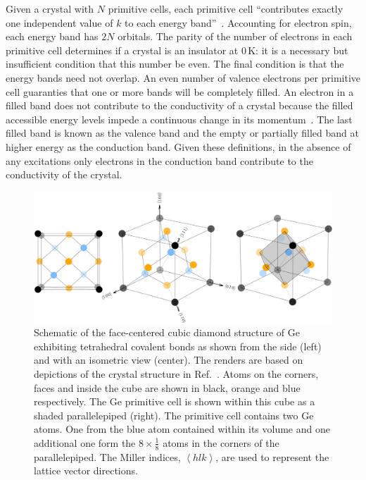 Given a crystal with $N$ primitive cells, each primitive cell ``contributes exactly one independent value of $k$ to each energy band''~\cite{kittel}. Accounting for electron spin, each energy band has $2N$ orbitals. The parity of the number of electrons in each primitive cell determines if a crystal is an insulator at 0\,K: it is a necessary but insufficient condition that this number be even. The final condition is that the energy bands need not overlap. An even number of valence electrons per primitive cell guaranties that one or more bands will be completely filled. An electron in a filled band does not contribute to the conductivity of a crystal because the filled accessible energy levels impede a continuous change in its momentum~\cite{kittel}. The last filled band is known as the valence band and the empty or partially filled band at higher energy as the conduction band. Given these definitions, in the absence of any excitations only electrons in the conduction band contribute to the conductivity of the crystal. 
\begin{figure}[htb]
	\centering
	\includegraphics[width=6in]{figs/ge/ge_structure.png}
	\caption{Schematic of the face-centered cubic diamond structure of Ge exhibiting tetrahedral covalent bonds as shown from the side (left) and with an isometric view (center). The renders are based on depictions of the crystal structure in Ref.~\cite{kittel}. Atoms on the corners, faces and inside the cube are shown in black, orange and blue respectively. The Ge primitive cell is shown within this cube as a shaded parallelepiped (right). The primitive cell contains two Ge atoms. One from the blue atom contained within its volume and one additional one form the $8\times\frac{1}{8}$ atoms in the corners of the parallelepiped. The Miller indices, $\left<hlk\right>$, are used to represent the lattice vector directions.} 
	\label{fig:ge_structure}
\end{figure}


